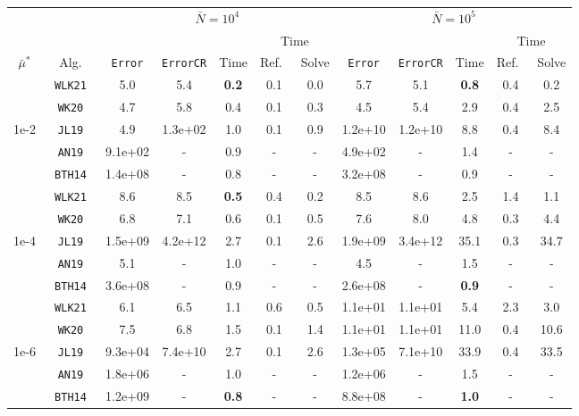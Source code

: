 \begin{tabular}{ccccccc|ccccc}%
\toprule
& & \multicolumn{5}{c}{$\bar N = 10^4$} & \multicolumn{5}{c}{$\bar N = 10^5$} \\
\cmidrule(lr){3-7} \cmidrule(lr){8-12}
& & & & & \multicolumn{2}{c}{Time} & & & & \multicolumn{2}{c}{Time} \\
\cmidrule(lr){6-7} \cmidrule(lr){11-12}
$\bar\mu^*$   & Alg.        & \texttt{Error} & \texttt{ErrorCR} & Time      & Ref.\ & Solve & \texttt{Error} & \texttt{ErrorCR} & Time     & Ref.\  & Solve \\
\midrule
& \texttt{ WLK21 }&  5.0&  5.4& \textbf{ 0.2 }&  0.1&  0.0&  5.7&  5.1& \textbf{ 0.8 }&  0.4&  0.2 \\
& \texttt{ WK20 }&  4.7&  5.8&  0.4&  0.1&  0.3&  4.5&  5.4&  2.9&  0.4&  2.5 \\
1e-2& \texttt{ JL19 }&  4.9&  1.3e+02&  1.0&  0.1&  0.9&  1.2e+10&  1.2e+10&  8.8&  0.4&  8.4 \\
& \texttt{ AN19 }&  9.1e+02& -&  0.9& -& -&  4.9e+02& -&  1.4& -& - \\
& \texttt{ BTH14 }&  1.4e+08& -&  0.8& -& -&  3.2e+08& -&  0.9& -& - \\
\midrule
& \texttt{ WLK21 }&  8.6&  8.5& \textbf{ 0.5 }&  0.4&  0.2&  8.5&  8.6&  2.5&  1.4&  1.1 \\
& \texttt{ WK20 }&  6.8&  7.1&  0.6&  0.1&  0.5&  7.6&  8.0&  4.8&  0.3&  4.4 \\
1e-4& \texttt{ JL19 }&  1.5e+09&  4.2e+12&  2.7&  0.1&  2.6&  1.9e+09&  3.4e+12&  35.1&  0.3&  34.7 \\
& \texttt{ AN19 }&  5.1& -&  1.0& -& -&  4.5& -&  1.5& -& - \\
& \texttt{ BTH14 }&  3.6e+08& -&  0.9& -& -&  2.6e+08& -& \textbf{ 0.9 }& -& - \\
\midrule
& \texttt{ WLK21 }&  6.1&  6.5&  1.1&  0.6&  0.5&  1.1e+01&  1.1e+01&  5.4&  2.3&  3.0 \\
& \texttt{ WK20 }&  7.5&  6.8&  1.5&  0.1&  1.4&  1.1e+01&  1.1e+01&  11.0&  0.4&  10.6 \\
1e-6& \texttt{ JL19 }&  9.3e+04&  7.4e+10&  2.7&  0.1&  2.6&  1.3e+05&  7.1e+10&  33.9&  0.4&  33.5 \\
& \texttt{ AN19 }&  1.8e+06& -&  1.0& -& -&  1.2e+06& -&  1.5& -& - \\
& \texttt{ BTH14 }&  1.2e+09& -& \textbf{ 0.8 }& -& -&  8.8e+08& -& \textbf{ 1.0 }& -& - \\
\bottomrule
\end{tabular}
